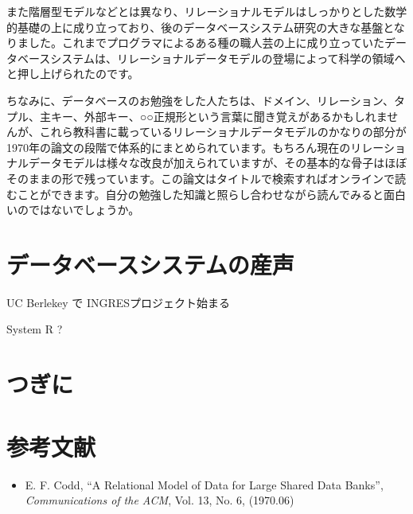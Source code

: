 また階層型モデルなどとは異なり、リレーショナルモデルはしっかりとした数学
的基礎の上に成り立っており、後のデータベースシステム研究の大きな基盤とな
りました。これまでプログラマによるある種の職人芸の上に成り立っていたデー
タベースシステムは、リレーショナルデータモデルの登場によって科学の領域へ
と押し上げられたのです。

ちなみに、データベースのお勉強をした人たちは、ドメイン、リレーション、タ
プル、主キー、外部キー、○○正規形という言葉に聞き覚えがあるかもしれませ
んが、これら教科書に載っているリレーショナルデータモデルのかなりの部分が
1970年の論文の段階で体系的にまとめられています。もちろん現在のリレーショ
ナルデータモデルは様々な改良が加えられていますが、その基本的な骨子はほぼ
そのままの形で残っています。この論文はタイトルで検索すればオンラインで読
むことができます。自分の勉強した知識と照らし合わせながら読んでみると面白
いのではないでしょうか。

\section{データベースシステムの産声}

UC Berlekey で INGRESプロジェクト始まる

System R ?

\section{つぎに}


\section*{参考文献}

\begin{itemize}
 \item E. F. Codd, ``A Relational Model of Data for Large Shared Data
       Banks'', {\it Communications of the ACM}, Vol. 13, No. 6, (1970.06)
\end{itemize}